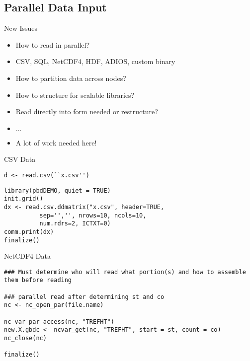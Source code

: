 \subsection{Parallel Data Input}

\begin{frame}
  \begin{block}{New Issues}\pause
    \begin{itemize}
    \item How to read in parallel?
    \item CSV, SQL, NetCDF4, HDF, ADIOS, custom binary
    \item How to partition data across nodes?
    \item How to structure for scalable libraries?
    \item Read directly into form needed or restructure?
    \item $\ldots$
    \item A lot of work needed here!
    \end{itemize}
  \end{block}
\end{frame}

\begin{frame}
  \begin{exampleblock}{CSV Data}\pause
\begin{lstlisting}[title=Serial Code]
d <- read.csv(``x.csv'')
\end{lstlisting}

\begin{lstlisting}[title=Parallel Code 0\_readcsv.r]
library(pbdDEMO, quiet = TRUE)
init.grid()
dx <- read.csv.ddmatrix("x.csv", header=TRUE,
          sep='','', nrows=10, ncols=10,
          num.rdrs=2, ICTXT=0)
comm.print(dx)
finalize()
\end{lstlisting}
  \end{exampleblock}
\end{frame}

\begin{frame}
  \begin{exampleblock}{NetCDF4 Data}\pause
    \begin{lstlisting}[title=Parallel Read]
### Must determine who will read what portion(s) and how to assemble them before reading

### parallel read after determining st and co
nc <- nc_open_par(file.name)

nc_var_par_access(nc, "TREFHT")
new.X.gbdc <- ncvar_get(nc, "TREFHT", start = st, count = co)
nc_close(nc)

finalize()
    \end{lstlisting}
  \end{exampleblock}
\end{frame}

